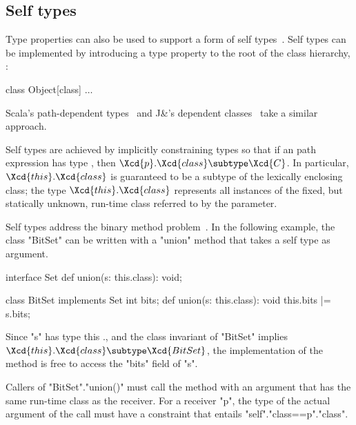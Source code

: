\subsection{Self types}

Type properties can also be used to support a form of self
types~\cite{bruce-binary,bsg95}.
%
Self types can be implemented by introducing a
type property  to the root of the class hierarchy, :
\begin{xtenmath}
class Object[class] { $\dots$ }
\end{xtenmath}
Scala's path-dependent types~\cite{scala} and J\&'s
dependent classes~\cite{nqm06}
take a similar approach.

Self types are achieved by
implicitly constraining types so that if an path expression 
has type , then
$\Xcd{p}.\Xcd{class} \subtype \Xcd{C}$.  In particular,
$\Xcd{this}.\Xcd{class}$ is guaranteed to be a subtype
of the lexically enclosing class; the type
$\Xcd{this}.\Xcd{class}$ represents all instances of the fixed,
but statically unknown, run-time class referred to by the 
parameter.

Self types address the binary method problem~\cite{bruce-binary}.
In the following
example, the class \xcd"BitSet" can be written with a
\xcd"union" method that takes a self type as argument.

\begin{xtenmath}
interface Set {
  def union(s: this.class): void;
}

class BitSet implements Set {
  int bits;
  def union(s: this.class): void {
    this.bits |= s.bits;
  }
}
\end{xtenmath}

\noindent
Since \xcd"s" has type this ., and the class
invariant of \xcd"BitSet" implies
$\Xcd{this}.\Xcd{class} \subtype \Xcd{BitSet}$,
the implementation of the method is free to access the
\xcd"bits" field of \xcd"s".

Callers of \xcd"BitSet".\xcd"union()" must call the method with
an argument that has the same run-time class as the
receiver.  For a receiver \xcd"p", the
type of the actual argument of the call must have a constraint
that entails \xcd"self".\xcd"class==p".\xcd"class".



